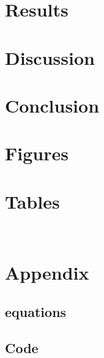 \documentclass[12pt]{article}
\begin{document}
\section{Results}%

\section{Discussion}%

\section{Conclusion}%

\section{Figures}
\section{Tables}
\
\section{Appendix}

\subsection{equations}


\subsection{Code}

\begin{verbatim}

\end{verbatim}




\end{document}

